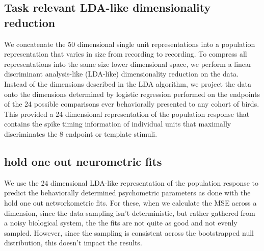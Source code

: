 \subsection*{Task relevant LDA-like dimensionality reduction}

We concatenate the 50 dimensional single unit representations into a population representation that varies in size from recording to recording. To compress all representations into the same size lower dimensional space, we perform a linear discriminant analysis-like (LDA-like) dimensionality reduction on the data. Instead of the dimensions described in the LDA algorithm, we project the data onto the dimensions determined by logistic regression performed on the endpoints of the 24 possible comparisons ever behaviorally presented to any cohort of birds. This provided a 24 dimensional representation of the population response that contains the spike timing information of individual units that maximally discriminates the 8 endpoint or template stimuli.

\subsection*{hold one out neurometric fits}

We use the 24 dimensional LDA-like representation of the population response to predict the behaviorally determined psychometric parameters as done with the hold one out networkometric fits. For these, when we calculate the MSE across a dimension, since the data sampling isn't deterministic, but rather gathered from a noisy biological system, the the fits are not quite as good and not evenly sampled. However, since the sampling is consistent across the bootstrapped null distribution, this doesn't impact the results.